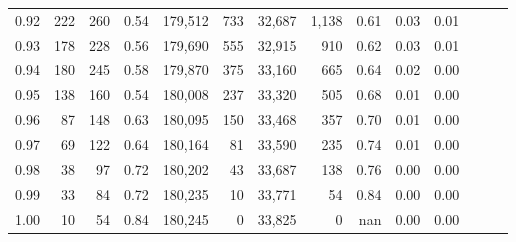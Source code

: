 \begin{tabular}{rrrrrrrrrrrrrr}
0.92 &    222 &  260 &  0.54 &  179,512 &      733 &  32,687 &   1,138 &  0.61 &  0.03 &      0.01 \\
0.93 &    178 &  228 &  0.56 &  179,690 &      555 &  32,915 &     910 &  0.62 &  0.03 &      0.01 \\
0.94 &    180 &  245 &  0.58 &  179,870 &      375 &  33,160 &     665 &  0.64 &  0.02 &      0.00 \\
0.95 &    138 &  160 &  0.54 &  180,008 &      237 &  33,320 &     505 &  0.68 &  0.01 &      0.00 \\
0.96 &     87 &  148 &  0.63 &  180,095 &      150 &  33,468 &     357 &  0.70 &  0.01 &      0.00 \\
0.97 &     69 &  122 &  0.64 &  180,164 &       81 &  33,590 &     235 &  0.74 &  0.01 &      0.00 \\
0.98 &     38 &   97 &  0.72 &  180,202 &       43 &  33,687 &     138 &  0.76 &  0.00 &      0.00 \\
0.99 &     33 &   84 &  0.72 &  180,235 &       10 &  33,771 &      54 &  0.84 &  0.00 &      0.00 \\
1.00 &     10 &   54 &  0.84 &  180,245 &        0 &  33,825 &       0 &   nan &  0.00 &      0.00 \\
\bottomrule
\end{tabular}
